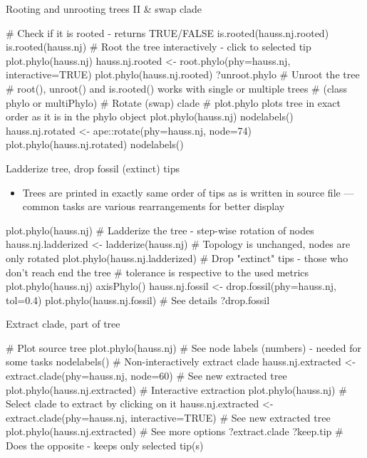 \documentclass[compress, xelatex, 11pt, xcolor=svgnames, aspectratio=169,
	hyperref={
		bookmarks=true,
		unicode=true,
		colorlinks=true,
		pdftitle={Molecular data in R},
		plainpages=false,
		pdfauthor={Vojtech Zeisek},
		pdfsubject={Course about phylogeny and evolution in R},
		pdfcreator={XeLaTeX},
		pdfkeywords={R, evolution, phylogeny, molecular data},
		linkcolor=Crimson, %
		anchorcolor=Magenta, %
		citecolor=Magenta, %
		filecolor=Magenta, %
		menucolor=Magenta, %
		urlcolor=DodgerBlue, %
		},
	url={hyphens, lowtilde} %
	]{beamer}
\begin{document}
\begin{frame}[fragile]{Rooting and unrooting trees II \& swap clade}
	\begin{spluscode}
    # Check if it is rooted - returns TRUE/FALSE
    is.rooted(hauss.nj.rooted)
    is.rooted(hauss.nj)
    # Root the tree interactively - click to selected tip
    plot.phylo(hauss.nj)
    hauss.nj.rooted <- root.phylo(phy=hauss.nj, interactive=TRUE)
    plot.phylo(hauss.nj.rooted)
    ?unroot.phylo # Unroot the tree
    # root(), unroot() and is.rooted() works with single or multiple trees
    # (class phylo or multiPhylo)
    # Rotate (swap) clade
    # plot.phylo plots tree in exact order as it is in the phylo object
    plot.phylo(hauss.nj)
    nodelabels()
    hauss.nj.rotated <- ape::rotate(phy=hauss.nj, node=74)
    plot.phylo(hauss.nj.rotated)
    nodelabels()
	\end{spluscode}
\end{frame}

\begin{frame}[fragile]{Ladderize tree, drop fossil (extinct) tips}
	\begin{itemize}
		\item Trees are printed in exactly same order of tips as is written in source file --- common tasks are various rearrangements for better display
	\end{itemize}
	\begin{spluscode}
    plot.phylo(hauss.nj)
    # Ladderize the tree - step-wise rotation of nodes
    hauss.nj.ladderized <- ladderize(hauss.nj)
    # Topology is unchanged, nodes are only rotated
    plot.phylo(hauss.nj.ladderized)
    # Drop "extinct" tips - those who don't reach end the tree
    # tolerance is respective to the used metrics
    plot.phylo(hauss.nj)
    axisPhylo()
    hauss.nj.fossil <- drop.fossil(phy=hauss.nj, tol=0.4)
    plot.phylo(hauss.nj.fossil)
    # See details
    ?drop.fossil
	\end{spluscode}
\end{frame}

\begin{frame}[fragile]{Extract clade, part of tree}
	\begin{spluscode}
    # Plot source tree
    plot.phylo(hauss.nj)
    # See node labels (numbers) - needed for some tasks
    nodelabels()
    # Non-interactively extract clade
    hauss.nj.extracted <- extract.clade(phy=hauss.nj, node=60)
    # See new extracted tree
    plot.phylo(hauss.nj.extracted)
    # Interactive extraction
    plot.phylo(hauss.nj)
    # Select clade to extract by clicking on it
    hauss.nj.extracted <- extract.clade(phy=hauss.nj, interactive=TRUE)
    # See new extracted tree
    plot.phylo(hauss.nj.extracted)
    # See more options
    ?extract.clade
    ?keep.tip # Does the opposite - keeps only selected tip(s)
	\end{spluscode}
\end{frame}
\end{document}

